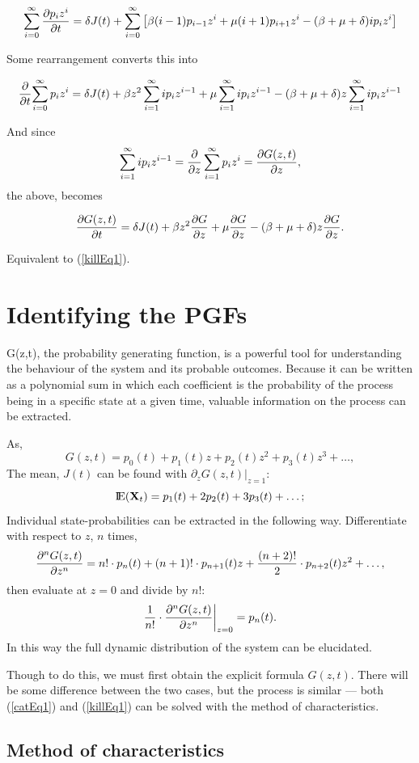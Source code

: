 $$
\sum^\infty_{i=0} \displaystyle\frac{\partial p_iz^i}{\partial t} = \delta J(t)   + \sum^\infty_{i=0}\left[ \beta (i-1) p_{i-1}z^i + \mu (i+1) p_{i+1}z^i - (\beta + \mu + \delta)ip_iz^i\right]$$

\noindent
Some rearrangement converts this into 

$$\displaystyle\frac{\partial }{\partial t}{\sum^\infty_{i=0} p_iz^i } = \delta J(t) + \beta z^2 \sum^\infty_{i=1} ip_iz^{i-1} + \mu\sum^\infty_{i=1}ip_iz^{i-1} - (\beta +\mu+\delta)z\sum^\infty_{i=1}ip_iz^{i-1}$$

\noindent
And since
$$\sum^\infty_{i=1} ip_iz^{i-1}  = \displaystyle\frac{\partial }{\partial z}\sum^\infty_{i=1} p_iz^{i} = \displaystyle\frac{\partial G(z,t)}{\partial z},$$
the above, becomes 

$$\displaystyle\frac{\partial G(z,t)}{\partial t} = \delta J(t) +  \beta z^2\displaystyle\frac{\partial G}{\partial z}  + \mu\displaystyle\frac{\partial G}{\partial z} - (\beta + \mu + \delta)z\displaystyle\frac{\partial G}{\partial z}.$$

\noindent
Equivalent to (\ref{killEq1}).

\section{Identifying the PGFs}

G(z,t), the probability generating function, is a powerful tool for understanding the behaviour of the system and its probable outcomes. Because it can be written as a polynomial sum in which each coefficient is the probability of the process being in a specific state at a given time, valuable information on the process can be extracted. \par
As,
$$G(z,t) = p_0(t) + p_1(t)z + p_2(t)z^2 + p_3(t)z^3 + \dots,$$
The mean, $J(t)$ can be found with $\partial_zG(z,t)|_{z=1}$:
$${\rm I}\!{\rm E}({{\bf X}_t}) = p_1(t) + 2p_2(t) + 3p_3(t) + \dots;$$
Individual state-probabilities can be extracted in the following way. Differentiate with respect to $z$, $n$ times,
$$\displaystyle\frac{\partial^{n} G(z,t)}{\partial {z}^{n}} =  n! \cdot p_n(t) + (n+1)! \cdot p_{n+1}(t) z + \frac{(n+2)!}{2} \cdot p_{n+2}(t) z^2 + \dots,$$
then evaluate at $z=0$ and divide by $n!$:
\begin{equation}
\label{stateFormula}
\frac{1}{n!}\cdot\displaystyle\frac{\partial^{n} G(z,t)}{\partial {z}^{n}}\bigg|_{z=0} = p_n(t).
\end{equation}
In this way the full dynamic distribution of the system can be elucidated.

Though to do this, we must first obtain the explicit formula $G(z,t)$. There will be some difference between the two cases, but the process is similar --- both (\ref{catEq1}) and (\ref{killEq1}) can be solved with the method of characteristics. 


\subsection{Method of characteristics}


